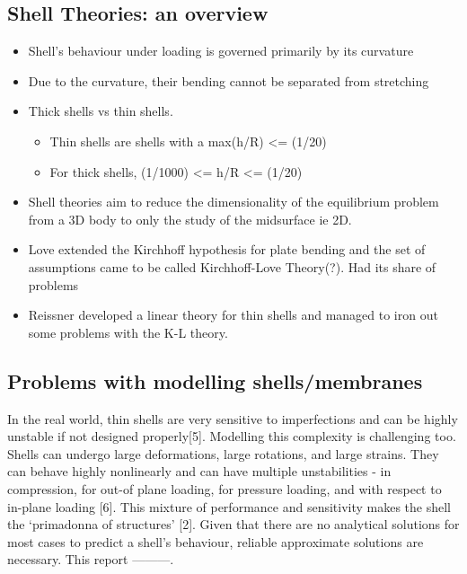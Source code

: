 \documentclass[../main.tex]{subfiles}
\begin{document}
\subsection{Shell Theories: an overview}
\begin{itemize}
    \item Shell's behaviour under loading is governed primarily by its curvature
    \item Due to the curvature, their bending cannot be separated from stretching
    \item Thick shells vs thin shells.
        \begin{itemize}
            \item Thin shells are shells with a max(h/R) <= (1/20)
            \item For thick shells, (1/1000) <= h/R <= (1/20)
        \end{itemize}
    \item Shell theories aim to reduce the dimensionality of the equilibrium problem from a 3D body to only the study of the midsurface ie 2D.  
    \item Love extended the Kirchhoff hypothesis for plate bending and the set of assumptions came to be called Kirchhoff-Love Theory(?). Had its share of problems
    \item Reissner developed a linear theory for thin shells and managed to iron out some problems with the K-L theory. 
\end{itemize}

\subsection{Problems with modelling shells/membranes}
In the real world, thin shells are very sensitive to imperfections and can be highly unstable if not designed properly[5]. Modelling this complexity is challenging too. Shells can undergo large deformations, large rotations, and large strains. They can behave highly nonlinearly and
 can have multiple unstabilities - in compression, for out-of plane loading, for pressure loading, and with respect to in-plane loading [6]. 
 This mixture of performance and sensitivity makes the shell the ‘primadonna of structures’ [2]. Given that there are no analytical solutions
 for most cases to predict a shell’s behaviour, reliable approximate solutions are necessary. This report ---------.
\end{document}
